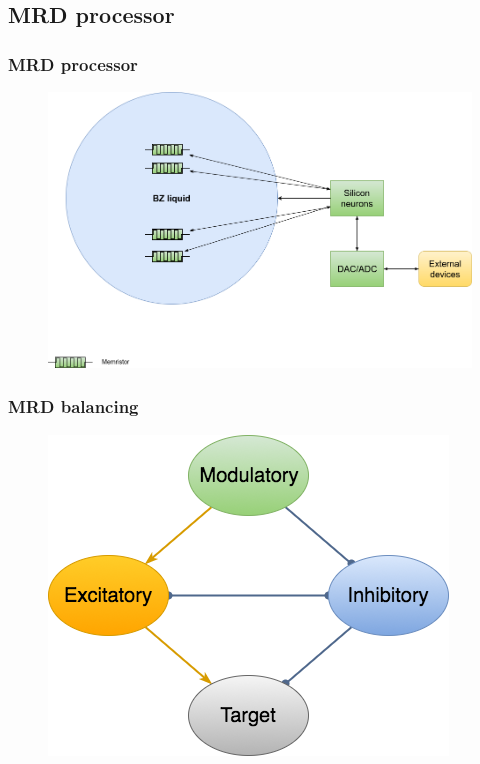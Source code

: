 \documentclass[12pt, aspectratio=169]{beamer}
\begin{document}
\subsection{MRD processor}

\begin{frame}
  \frametitle{MRD processor}
  
\begin{figure}
\includegraphics[width=0.8\linewidth]{MRD_silicon_neurons}
\end{figure}

\end{frame}


\begin{frame}
  \frametitle{MRD balancing}
  
\begin{figure}
\includegraphics[width=0.6\linewidth]{MRD_balancing}
\end{figure}

\end{frame}

\end{document}
